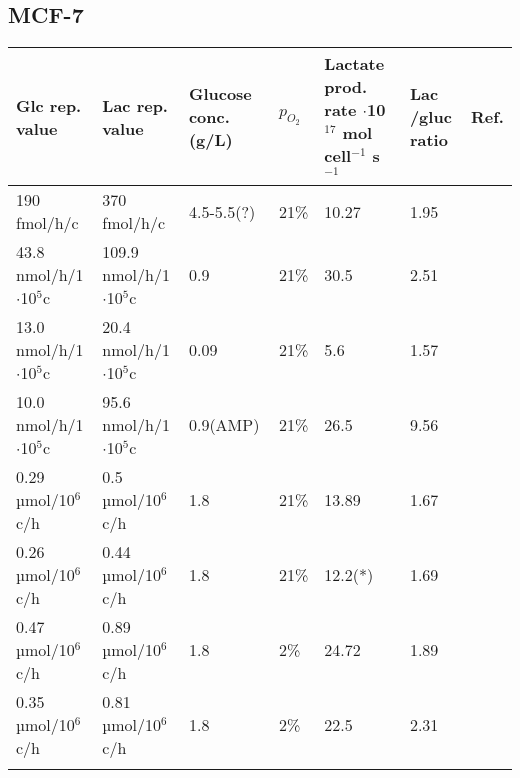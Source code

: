\documentclass[11pt,a4paper]{article}
\begin{document}
\subsection{MCF-7}

\begin{table}[h!]
\begin{center}
\begin{tabular}{ |p{25mm}|p{25mm}|p{20mm}|p{10mm}|p{20mm}|p{10mm}|p{7mm}| }
 \hline

  \textbf{Glc rep. value} & \textbf{Lac rep.  value} & \textbf{Glucose conc. (g/L)} & $p_{O_2}$ &\textbf{Lactate prod. rate} $\cdot$10$^{17}$ mol cell$^{-1}$ s$^{-1}$  & \textbf{Lac /gluc ratio} & \textbf{Ref}. \\
 \hline
     190 fmol/h/c  & 370 fmol/h/c & 4.5-5.5(?) & 21\% & 10.27 & 1.95 & \cite{Meadows2008}\\
 \hline
      43.8 nmol/h/1$\cdot$10$^{5}$c  & 109.9 nmol/h/1$\cdot$10$^{5}$c & 0.9 & 21\% & 30.5 & 2.51 & \cite{Mazurek1997}\\
 \hline
      13.0 nmol/h/1$\cdot$10$^{5}$c  & 20.4 nmol/h/1$\cdot$10$^{5}$c & 0.09 & 21\% & 5.6 & 1.57  & \cite{Mazurek1997}\\
 \hline
       10.0 nmol/h/1$\cdot$10$^{5}$c  & 95.6 nmol/h/1$\cdot$10$^{5}$c & 0.9(AMP) & 21\% & 26.5 & 9.56 & \cite{Mazurek1997}\\
 \hline
       0.29 µmol/10$^6$c/h  & 0.5 µmol/10$^6$c/h & 1.8 & 21\% & 13.89 & 1.67 & \cite{Prado-Garcia2020}\\
 \hline
        0.26 µmol/10$^6$c/h  & 0.44 µmol/10$^6$c/h & 1.8 & 21\% & 12.2(*) & 1.69 & \cite{Prado-Garcia2020}\\
 \hline
         0.47 µmol/10$^6$c/h  & 0.89 µmol/10$^6$c/h & 1.8 & 2\% & 24.72 & 1.89 & \cite{Prado-Garcia2020}\\
 \hline
          0.35 µmol/10$^6$c/h  & 0.81 µmol/10$^6$c/h & 1.8 & 2\% & 22.5 & 2.31 & \cite{Prado-Garcia2020}\\
 \hline
             &  &  &  &  &  & \cite{Bayar2021}\\
 \hline

\end{tabular}
\end{center}
\end{table}
\end{document}

